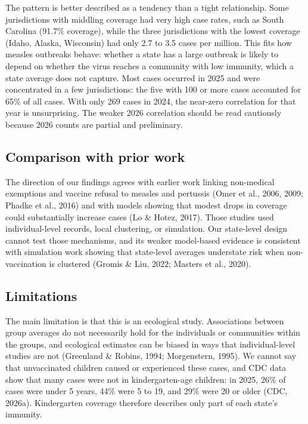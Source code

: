 \documentclass[12pt]{article}
\begin{document}
The pattern is better described as a tendency than a tight relationship. Some jurisdictions with middling coverage had very high case rates, such as South Carolina (91.7\% coverage), while the three jurisdictions with the lowest coverage (Idaho, Alaska, Wisconsin) had only 2.7 to 3.5 cases per million. This fits how measles outbreaks behave: whether a state has a large outbreak is likely to depend on whether the virus reaches a community with low immunity, which a state average does not capture. Most cases occurred in 2025 and were concentrated in a few jurisdictions: the five with 100 or more cases accounted for 65\% of all cases. With only 269 cases in 2024, the near-zero correlation for that year is unsurprising. The weaker 2026 correlation should be read cautiously because 2026 counts are partial and preliminary.

\subsection*{Comparison with prior work}

The direction of our findings agrees with earlier work linking non-medical exemptions and vaccine refusal to measles and pertussis (Omer et al., 2006, 2009; Phadke et al., 2016) and with models showing that modest drops in coverage could substantially increase cases (Lo \& Hotez, 2017). Those studies used individual-level records, local clustering, or simulation. Our state-level design cannot test those mechanisms, and its weaker model-based evidence is consistent with simulation work showing that state-level averages understate risk when non-vaccination is clustered (Gromis \& Liu, 2022; Masters et al., 2020).

\subsection*{Limitations}

The main limitation is that this is an ecological study. Associations between group averages do not necessarily hold for the individuals or communities within the groups, and ecological estimates can be biased in ways that individual-level studies are not (Greenland \& Robins, 1994; Morgenstern, 1995). We cannot say that unvaccinated children caused or experienced these cases, and CDC data show that many cases were not in kindergarten-age children: in 2025, 26\% of cases were under 5 years, 44\% were 5 to 19, and 29\% were 20 or older (CDC, 2026a). Kindergarten coverage therefore describes only part of each state's immunity.
\end{document}
